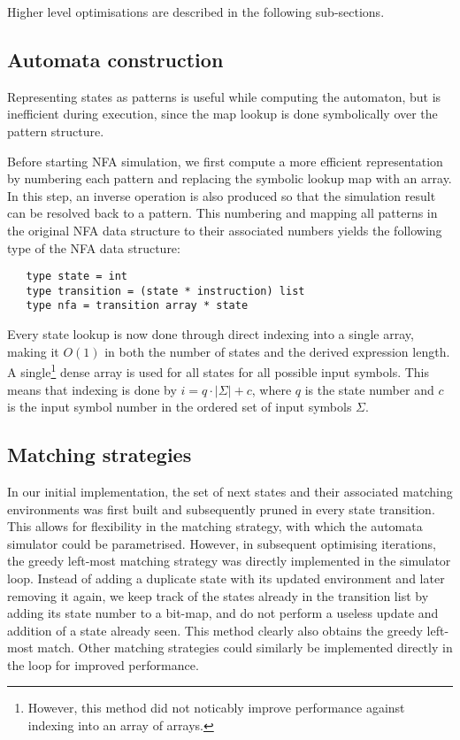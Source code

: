 Higher level optimisations are described in the following sub-sections.


\subsection{Automata construction}

Representing states as patterns is useful while computing the automaton, but is
inefficient during execution, since the map lookup is done symbolically over the
pattern structure.

Before starting NFA simulation, we first compute a more efficient representation
by numbering each pattern and replacing the symbolic lookup map with an array.
In this step, an inverse operation is also produced so that the simulation
result can be resolved back to a pattern. This numbering and mapping all
patterns in the original NFA data structure to their associated numbers yields
the following type of the NFA data structure:

\begin{lstlisting}
   type state = int
   type transition = (state * instruction) list
   type nfa = transition array * state
\end{lstlisting}

Every state lookup is now done through direct indexing into a single array,
making it $O(1)$ in both the number of states and the derived expression length.
A single\footnote{However, this method did not noticably improve performance
against indexing into an array of arrays.} dense array is used for all states
for all possible input symbols. This means that indexing is done by $i = q \cdot
|\Sigma| + c$, where $q$ is the state number and $c$ is the input symbol number
in the ordered set of input symbols $\Sigma$.


\subsection{Matching strategies}

In our initial implementation, the set of next states and their associated
matching environments was first built and subsequently pruned in every state
transition. This allows for flexibility in the matching strategy, with which the
automata simulator could be parametrised. However, in subsequent optimising
iterations, the greedy left-most matching strategy was directly implemented in
the simulator loop. Instead of adding a duplicate state with its updated
environment and later removing it again, we keep track of the states already in
the transition list by adding its state number to a bit-map, and do not perform
a useless update and addition of a state already seen. This method clearly also
obtains the greedy left-most match. Other matching strategies could similarly be
implemented directly in the loop for improved performance.

